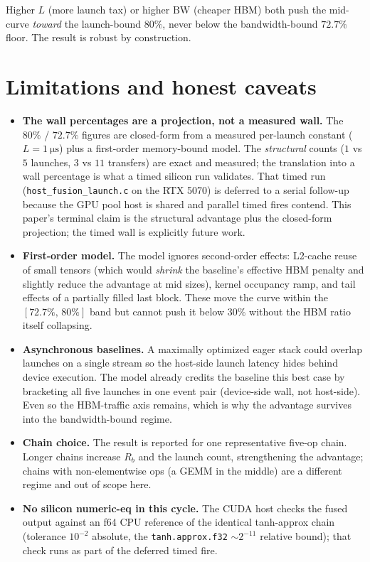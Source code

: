 \documentclass[11pt,a4paper]{article}
\begin{document}
Higher $L$ (more launch tax) or higher $\mathrm{BW}$ (cheaper HBM) both push the
mid-curve \emph{toward} the launch-bound $80\%$, never below the bandwidth-bound
$72.7\%$ floor. The result is robust by construction.

\section{Limitations and honest caveats}
\label{sec:limits}

\begin{itemize}\itemsep0.3em
\item \textbf{The wall percentages are a projection, not a measured wall.} The
  $80\%$ / $72.7\%$ figures are closed-form from a measured per-launch constant
  ($L=\SI{1}{\micro\second}$) plus a first-order memory-bound model. The
  \emph{structural} counts ($1$ vs $5$ launches, $3$ vs $11$ transfers) are
  exact and measured; the translation into a wall percentage is what a timed
  silicon run validates. That timed run (\texttt{host\_fusion\_launch.c} on the
  RTX 5070) is deferred to a serial follow-up because the GPU pool host is
  shared and parallel timed fires contend. This paper's terminal claim is the
  structural advantage plus the closed-form projection; the timed wall is
  explicitly future work.
\item \textbf{First-order model.} The model ignores second-order effects:
  L2-cache reuse of small tensors (which would \emph{shrink} the baseline's
  effective HBM penalty and slightly reduce the advantage at mid sizes), kernel
  occupancy ramp, and tail effects of a partially filled last block. These move
  the curve within the $[72.7\%,\,80\%]$ band but cannot push it below $30\%$
  without the HBM ratio itself collapsing.
\item \textbf{Asynchronous baselines.} A maximally optimized eager stack could
  overlap launches on a single stream so the host-side launch latency hides
  behind device execution. The model already credits the baseline this best
  case by bracketing all five launches in one event pair (device-side wall, not
  host-side). Even so the HBM-traffic axis remains, which is why the advantage
  survives into the bandwidth-bound regime.
\item \textbf{Chain choice.} The result is reported for one representative
  five-op chain. Longer chains increase $R_b$ and the launch count, strengthening
  the advantage; chains with non-elementwise ops (a GEMM in the middle) are a
  different regime and out of scope here.
\item \textbf{No silicon numeric-eq in this cycle.} The CUDA host checks the
  fused output against an f64 CPU reference of the identical tanh-approx chain
  (tolerance $10^{-2}$ absolute, the \texttt{tanh.approx.f32} $\sim 2^{-11}$
  relative bound); that check runs as part of the deferred timed fire.
\end{itemize}
\end{document}

